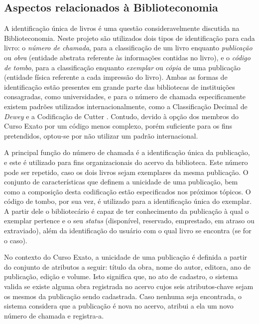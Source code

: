 \documentclass[a4paper]{article}
\begin{document}
\subsection{Aspectos relacionados à Biblioteconomia}

A identificação única de livros é uma questão consideravelmente discutida na Biblioteconomia. Neste projeto são utilizados dois tipos de identificação para cada livro: o \textit{número de chamada}, para a classificação de um livro enquanto \textit{publicação} ou \textit{obra} (entidade abstrata referente às informações contidas no livro), e o \textit{código de tombo}, para a classificação enquanto \textit{exemplar} ou \textit{cópia} de uma publicação (entidade física referente a cada impressão do livro). Ambas as formas de identificação estão presentes em grande parte das bibliotecas de instituições consagradas, como universidades, e para o número de chamada especificamente existem padrões utilizados internacionalmente, como a Classificação Decimal de \textit{Dewey} \cite{dewey} e a Codificação de Cutter \cite{cutter}. Contudo, devido à opção dos membros do Curso Exato por um código menos complexo, porém suficiente para os fins pretendidos, optou-se por não utilizar um padrão internacional. 

A principal função do número de chamada é a identificação única da publicação, e este é utilizado para fins organizacionais do acervo da biblioteca. Este número pode ser repetido, caso os dois livros sejam exemplares da mesma publicação. O conjunto de características que definem a unicidade de uma publicação, bem como a composição desta codificação estão especificados nos próximos tópicos. O código de tombo, por sua vez, é utilizado para a identificação única do exemplar. A partir dele o bibliotecário é capaz de ter conhecimento da publicação à qual o exemplar pertence e o seu \textit{status} (disponível, reservado, emprestado, em atraso ou extraviado), além da identificação do usuário com o qual livro se encontra (se for o caso).

No contexto do Curso Exato, a unicidade de uma publicação é definida a partir do conjunto de atributos a seguir: título da obra, nome do autor, editora, ano de publicação, edição e volume. Isto significa que, no ato de cadastro, o sistema valida se existe alguma obra registrada no acervo cujos seis atributos-chave sejam os mesmos da publicação sendo cadastrada. Caso nenhuma seja encontrada, o sistema considera que a publicação é nova no acervo, atribui a ela um novo número de chamada e registra-a.
\end{document}

